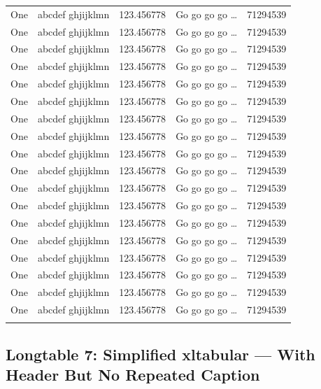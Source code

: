 \documentclass[phd,showframe]{ndsu-thesis-2022}
\begin{document}
\begin{longtable}{l l l l r}
One & abcdef ghjijklmn & 123.456778  & Go go go go \ldots & \num{71294539}\\
One & abcdef ghjijklmn & 123.456778  & Go go go go \ldots & \num{71294539}\\
One & abcdef ghjijklmn & 123.456778  & Go go go go \ldots & \num{71294539}\\
One & abcdef ghjijklmn & 123.456778  & Go go go go \ldots & \num{71294539}\\
One & abcdef ghjijklmn & 123.456778  & Go go go go \ldots & \num{71294539}\\
One & abcdef ghjijklmn & 123.456778  & Go go go go \ldots & \num{71294539}\\
One & abcdef ghjijklmn & 123.456778  & Go go go go \ldots & \num{71294539}\\
One & abcdef ghjijklmn & 123.456778  & Go go go go \ldots & \num{71294539}\\
One & abcdef ghjijklmn & 123.456778  & Go go go go \ldots & \num{71294539}\\
One & abcdef ghjijklmn & 123.456778  & Go go go go \ldots & \num{71294539}\\
One & abcdef ghjijklmn & 123.456778  & Go go go go \ldots & \num{71294539}\\
One & abcdef ghjijklmn & 123.456778  & Go go go go \ldots & \num{71294539}\\
One & abcdef ghjijklmn & 123.456778  & Go go go go \ldots & \num{71294539}\\
One & abcdef ghjijklmn & 123.456778  & Go go go go \ldots & \num{71294539}\\
One & abcdef ghjijklmn & 123.456778  & Go go go go \ldots & \num{71294539}\\
One & abcdef ghjijklmn & 123.456778  & Go go go go \ldots & \num{71294539}\\
One & abcdef ghjijklmn & 123.456778  & Go go go go \ldots & \num{71294539}\\
One & abcdef ghjijklmn & 123.456778  & Go go go go \ldots & \num{71294539}\\
\bottomrule
\label{lt:sim}
\end{longtable}
\endgroup



\mysectop
\subsection{Longtable 7: Simplified xltabular --- With Header But No Repeated Caption}
\end{document}
